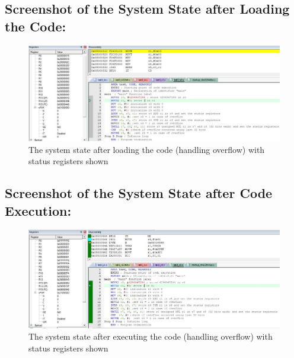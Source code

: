 \documentclass[12pt]{article}
\begin{document}
\subsection{Screenshot of the System State after Loading the Code:}
\begin{figure}[ht]
    \centering
    \includegraphics[scale=.6]{images/lab3_3_ss3.jpg}
    \caption{The system state after loading the code (handling overflow) with status registers shown}
    \label{fig:before_task_five_two}
\end{figure}
\pagebreak
\subsection{Screenshot of the System State after Code Execution:}
\begin{figure}[ht]
    \centering
    \includegraphics[scale=.6]{images/lab3_3_ss4.jpg}
    \caption{The system state after executing the code (handling overflow) with status registers shown}
    \label{fig:after_task_five_two}
\end{figure}
\end{document}
